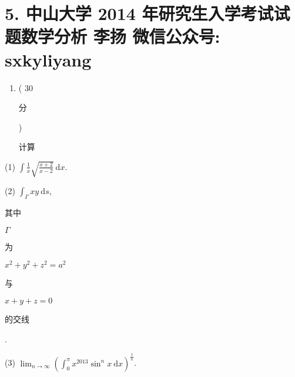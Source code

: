 \documentclass[10pt]{article}
\begin{document}
\section{5. 中山大学 2014 年研究生入学考试试题数学分析 
 李扬 
 微信公众号: sxkyliyang}
\begin{enumerate}
  \item ( 30 \begin{CJK}{UTF8}{mj}分\end{CJK})\begin{CJK}{UTF8}{mj}计算\end{CJK}
\end{enumerate}
(1) $\int \frac{1}{x} \sqrt{\frac{x+2}{x-2}} \mathrm{~d} x$.

(2) $\int_{\Gamma} x y \mathrm{~d} s$, \begin{CJK}{UTF8}{mj}其中\end{CJK} $\Gamma$ \begin{CJK}{UTF8}{mj}为\end{CJK} $x^{2}+y^{2}+z^{2}=a^{2}$ \begin{CJK}{UTF8}{mj}与\end{CJK} $x+y+z=0$ \begin{CJK}{UTF8}{mj}的交线\end{CJK}.

(3) $\lim _{n \rightarrow \infty}\left(\int_{0}^{\pi} x^{2013} \sin ^{n} x \mathrm{~d} x\right)^{\frac{1}{n}}$.
\end{document}
